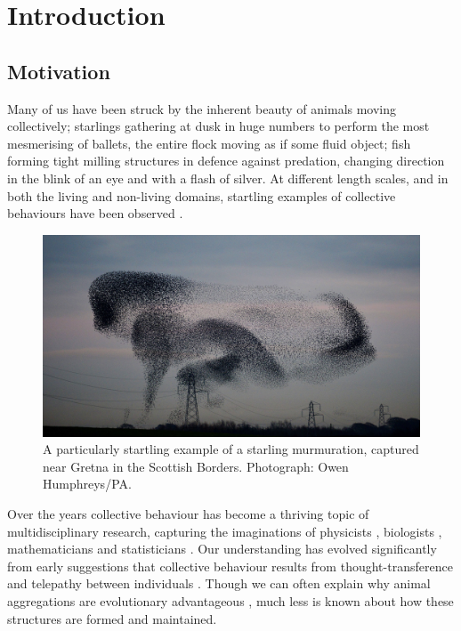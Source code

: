 \chapter{Introduction}
\label{cha:introduction}

\section{Motivation}
\label{sec:motivation}

Many of us have been struck by the inherent beauty of animals moving collectively; starlings gathering at dusk in huge numbers to perform the most mesmerising of ballets, the entire flock moving as if some fluid object; fish forming tight milling structures in defence against predation, changing direction in the blink of an eye and with a flash of silver. At different length scales, and in both the living and non-living domains, startling examples of collective behaviours have been observed \citep{parrish99}.

\begin{figure}[!htbp]
	\includegraphics[width=\textwidth]{fig/murmuration.jpg}
	\caption{A particularly startling example of a starling murmuration, captured near Gretna in the Scottish Borders. Photograph: Owen Humphreys/PA.}
	\label{fig:murmuration}
\end{figure}

Over the years collective behaviour has become a thriving topic of multidisciplinary research, capturing the imaginations of physicists \citep{vicsek95}, biologists \citep{couzin02}, mathematicians \citep{lukeman10} and statisticians \citep{mann11}. Our understanding has evolved significantly from early suggestions that collective behaviour results from thought-transference and telepathy between individuals \citep{selous31}. Though we can often explain why animal aggregations are evolutionary advantageous \citep{giardina08}, much less is known about how these structures are formed and maintained.

